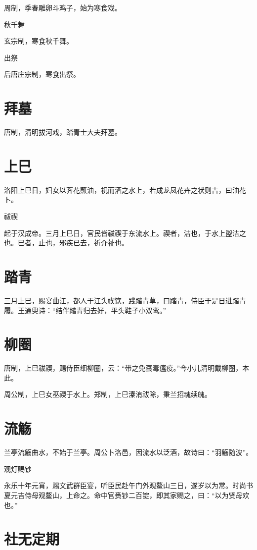 \documentclass[a4paper,12pt,UTF8,twoside]{ctexbook}
\begin{document}
周制，季春雕卵斗鸡子，始为寒食戏。

秋千舞

玄宗制，寒食秋千舞。

出祭

后唐庄宗制，寒食出祭。

	\section{拜墓}

唐制，清明拔河戏，踏青士大夫拜墓。

	\section{上巳}

洛阳上巳日，妇女以荠花蘸油，祝而洒之水上，若成龙凤花卉之状则吉，曰油花卜。

祓禊

起于汉成帝。三月上巳日，官民皆祓禊于东流水上。禊者，洁也，于水上盥洁之也。巳者，止也，邪疾已去，祈介祉也。

	\section{踏青}

三月上巳，赐宴曲江，都人于江头禊饮，践踏青草，曰踏青，侍臣于是日进踏青履。王通臾诗：“结伴踏青归去好，平头鞋子小双鸾。”

	\section{柳圈}

唐制，上巳祓禊，赐侍臣细柳圈，云：“带之免虿毒瘟疫。”今小儿清明戴柳圈，本此。

周公制，上巳女巫禊于水上。郑制，上巳溱洧祓除，秉兰招魂续魄。

	\section{流觞}

兰亭流觞曲水，不始于兰亭。周公卜洛邑，因流水以泛酒，故诗曰：“羽觞随波”。

观灯赐钞

永乐十年元宵，赐文武群臣宴，听臣民赴午门外观鳌山三日，遂岁以为常。时尚书夏元吉侍母观鳌山，上命之。命中官赉钞二百锭，即其家赐之，曰：“以为贤母欢也。”

	\section{社无定期}
\end{document}
